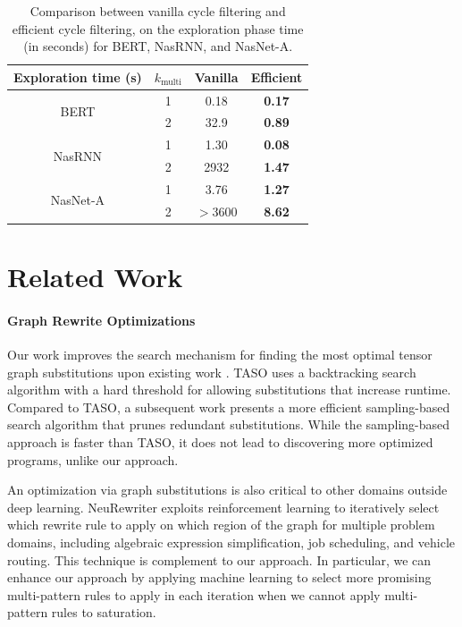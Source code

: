 \documentclass{article}
\begin{document}
\begin{table}[]
    \centering
    \footnotesize
    \begin{tabular}{cccc}
    \toprule
        {\bf Exploration time (s)} & {\bf $k_{\textrm{multi}}$} & 
        {\bf Vanilla} & {\bf Efficient} \\
    \midrule
       \multirow{2}{*}{BERT} & 1 & 0.18 & \textbf{0.17} \\
       & 2 & 32.9 & \textbf{0.89} \\
       \midrule
       \multirow{2}{*}{NasRNN} & 1 & 1.30 & \textbf{0.08}  \\
       & 2 & 2932 & \textbf{1.47} \\
       \midrule
       \multirow{2}{*}{NasNet-A} & 1 & 3.76 & \textbf{1.27} \\
       & 2 & $>$3600 & \textbf{8.62} \\
    \bottomrule
    \end{tabular}
    \caption{Comparison between vanilla cycle filtering and efficient cycle filtering, on the exploration phase time (in seconds) for BERT, NasRNN, and NasNet-A.}
    \label{table:efficient}
\end{table}


\section{Related Work}

\paragraph{Graph Rewrite Optimizations}

Our work improves the search mechanism for finding the most optimal tensor graph substitutions upon existing work \cite{taso,metaflow,Fang:sampling}. TASO \cite{metaflow,taso} uses a backtracking search algorithm with a hard threshold for allowing substitutions that increase runtime. Compared to TASO, a subsequent work \cite{Fang:sampling} presents a more efficient sampling-based search algorithm that prunes redundant substitutions. While the sampling-based approach is faster than TASO, it does not lead to discovering more optimized programs, unlike our approach. 

An optimization via graph substitutions is also critical to other domains outside deep learning. NeuRewriter \cite{NeuRewriter} exploits reinforcement learning to iteratively select which rewrite rule to apply on which region of the graph for multiple problem domains, including algebraic expression simplification, job scheduling, and vehicle routing. This technique is complement to our approach. In particular, we can enhance our approach by applying machine learning to select more promising multi-pattern rules to apply in each iteration when we cannot apply multi-pattern rules to saturation.
\end{document}

